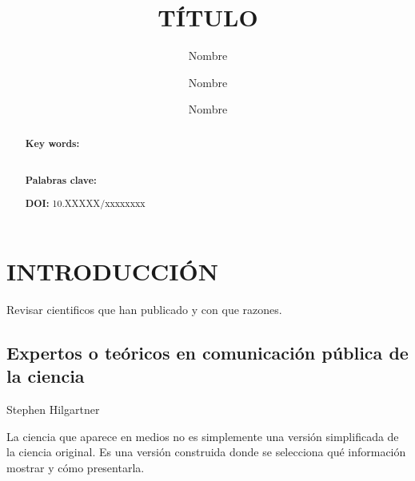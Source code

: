 \documentclass[11pt,                                                            
 superscriptaddress,twoside,
 amsmath,amssymb,
 aps, physrev
]{revtex4-2}
\begin{document}
\title{TÍTULO}
\author{Nombre}

\author{Nombre}

\author{Nombre}


\begin{abstract}
\begin{center}
    {\scriptsize }
\end{center}
{\fontsize{9pt}{11pt}\selectfont



\textbf{Key words:} 

\lipsum[2] \\ %
\textbf{Palabras clave:} 

{\textbf{DOI:} 10.XXXXX/xxxxxxxx} %
\par}
\end{abstract}
\maketitle
\thispagestyle{portada}

\section{INTRODUCCIÓN}
Revisar cientificos que han publicado y con que razones. 
\subsection{Expertos o teóricos en comunicación pública de la ciencia}

Stephen Hilgartner

La ciencia que aparece en medios no es simplemente una versión simplificada de la ciencia original. Es una versión construida donde se selecciona qué información mostrar y cómo presentarla.
\end{document}
